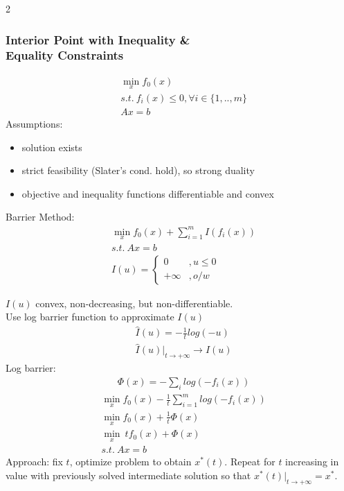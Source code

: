 \documentclass[8pt]{extarticle}
\newcommand{\set}[1]{\{#1\}}
\begin{document}
\begin{multicols*}{2}
  \subsubsection{Interior Point with Inequality \&\\ Equality Constraints}
  \begin{align*}
    &\min_x f_0(x)\\
    &s.t.\ f_i(x) \leq 0, \forall i\in\set{1,..,m}\\
    & Ax = b
  \end{align*}
  Assumptions:
  \begin{itemize}
  \item solution exists
  \item strict feasibility (Slater's cond. hold), so strong duality
  \item objective and inequality functions differentiable and convex
  \end{itemize}

  Barrier Method:
  \begin{align*}
    &\min_x f_0(x) + \sum_{i=1}^m I(f_i(x))\\
    &s.t.\ Ax = b\\
    &I(u) =
      \begin{cases}
        0 &, u \leq 0\\
        +\infty &, o/w
      \end{cases}
  \end{align*}

  \vfill\null
  \columnbreak
  
  $I(u)$ convex, non-decreasing, but non-differentiable.\\
  
  Use log barrier function to approximate $I(u)$
  \begin{align*}
    &\hat{I}(u) = -\frac{1}{t}log(-u)\\
    &\hat{I}(u)|_{t \to +\infty} \to I(u)
  \end{align*}
  Log barrier:
  \begin{align*}
    &\Phi(x) = -\sum_i log(-f_i(x))
  \end{align*}
  \begin{align*}
    &\min_x f_0(x) - \frac{1}{t} \sum_{i=1}^m log(-f_i(x))\\
    &\min_x f_0(x) + \frac{1}{t} \Phi(x)\\
    &\min_x\ t f_0(x) + \Phi(x)\\
    &s.t.\ Ax = b
  \end{align*}
  Approach: fix $t$, optimize problem to obtain $x^*(t)$. Repeat for $t$ increasing in value with previously solved intermediate solution so that $x^*(t)|_{t\to +\infty} = x^*$.\\


\end{multicols*}
\end{document}

